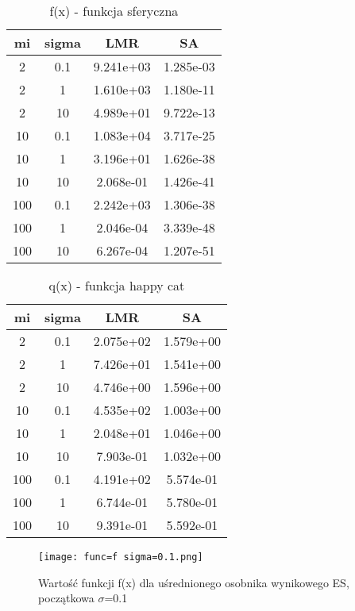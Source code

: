 \documentclass{article}
\begin{document}
\begin{center}
\begin{longtable}{|c c c c|}
\caption{f(x) - funkcja sferyczna} \\
\hline
mi & sigma & LMR & SA \\
\hline \hline
2 & 0.1 & 9.241e+03 & 1.285e-03 \\
\hline2 & 1 & 1.610e+03 & 1.180e-11 \\
\hline2 & 10 & 4.989e+01 & 9.722e-13 \\
\hline\hline10 & 0.1 & 1.083e+04 & 3.717e-25 \\
\hline10 & 1 & 3.196e+01 & 1.626e-38 \\
\hline10 & 10 & 2.068e-01 & 1.426e-41 \\
\hline\hline100 & 0.1 & 2.242e+03 & 1.306e-38 \\
\hline100 & 1 & 2.046e-04 & 3.339e-48 \\
\hline100 & 10 & 6.267e-04 & 1.207e-51 \\
\hline

\end{longtable}
\end{center}

\begin{center}
\begin{longtable}{|c c c c|}
\caption{q(x) - funkcja happy cat} \\
\hline
mi & sigma & LMR & SA \\
\hline \hline
2 & 0.1 & 2.075e+02 & 1.579e+00 \\
\hline2 & 1 & 7.426e+01 & 1.541e+00 \\
\hline2 & 10 & 4.746e+00 & 1.596e+00 \\
\hline\hline10 & 0.1 & 4.535e+02 & 1.003e+00 \\
\hline10 & 1 & 2.048e+01 & 1.046e+00 \\
\hline10 & 10 & 7.903e-01 & 1.032e+00 \\
\hline\hline100 & 0.1 & 4.191e+02 & 5.574e-01 \\
\hline100 & 1 & 6.744e-01 & 5.780e-01 \\
\hline100 & 10 & 9.391e-01 & 5.592e-01 \\
\hline

\end{longtable}
\end{center}

\begin{figure}[H]
\caption{Wartość funkcji f(x) dla uśrednionego osobnika wynikowego ES, początkowa $\sigma$=0.1}
\centering
\texttt{[image: func=f sigma=0.1.png]}
\end{figure}
\end{document}
